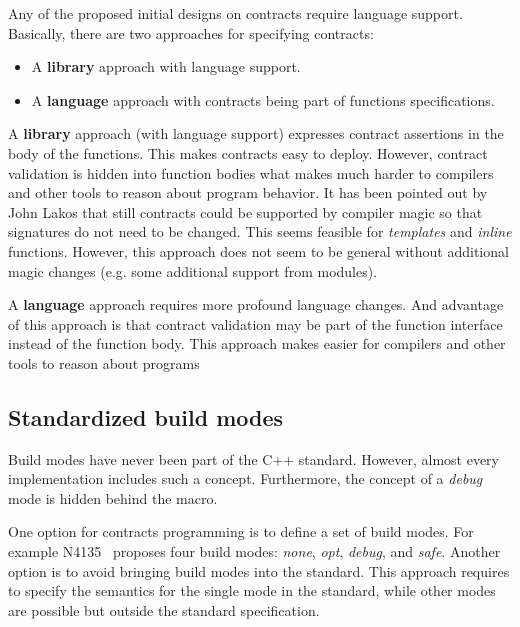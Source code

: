 Any of the proposed initial designs on contracts require language support.
Basically, there are two approaches for specifying contracts:

\begin{itemize}
\item A \textbf{library} approach with language support.
\item A \textbf{language} approach with contracts being part of functions
specifications.
\end{itemize}

A \textbf{library} approach (with language support) expresses contract
assertions in the body of the functions. This makes contracts easy to deploy.
However, contract validation is hidden into function bodies what makes much
harder to compilers and other tools to reason about program behavior. It has been
pointed out by John Lakos that still contracts could be supported by compiler magic
so that signatures do not need to be changed. This seems feasible for \emph{templates}
and \emph{inline} functions. However, this approach does not seem to be general
without additional magic changes (e.g. some additional support from modules).	

A \textbf{language} approach requires more profound language changes. And
advantage of this approach is that contract validation may be part of the
function interface instead of the function body. This approach makes easier for
compilers and other tools to reason about programs


\subsection{Standardized build modes}

Build modes have never been part of the C++ standard. However, almost every
implementation includes such a concept. Furthermore, the concept of a
\emph{debug} mode is hidden behind the  macro.

One option for contracts programming is to define a set of build modes. For
example N4135~\cite{n4253} proposes four build modes: \emph{none}, \emph{opt},
\emph{debug}, and \emph{safe}. Another option is to avoid bringing build modes
into the standard. This approach requires to specify the semantics for the
single mode in the standard, while other modes are possible but outside the
standard specification.

